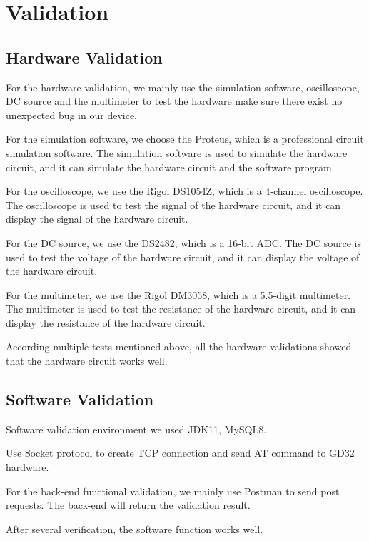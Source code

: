 \documentclass[11pt, a4paper]{article}
\begin{document}
\section{Validation}

\subsection{Hardware Validation}

For the hardware validation, we mainly use the simulation software, oscilloscope, DC source and the multimeter to test the hardware make sure there exist no unexpected bug in our device.

For the simulation software, we choose the Proteus, which is a professional circuit simulation software.
The simulation software is used to simulate the hardware circuit, and it can simulate the hardware circuit and the software program.

For the oscilloscope, we use the Rigol DS1054Z, which is a 4-channel oscilloscope.
The oscilloscope is used to test the signal of the hardware circuit, and it can display the signal of the hardware circuit.

For the DC source, we use the DS2482, which is a 16-bit ADC.
The DC source is used to test the voltage of the hardware circuit, and it can display the voltage of the hardware circuit.

For the multimeter, we use the Rigol DM3058, which is a 5.5-digit multimeter.
The multimeter is used to test the resistance of the hardware circuit, and it can display the resistance of the hardware circuit.

According multiple tests mentioned above, all the hardware validations showed that the hardware circuit works well.
\subsection{Software Validation}
Software validation environment we used JDK11, MySQL8.

Use Socket protocol to create TCP connection and send AT command to GD32 hardware.

For the back-end functional validation, we mainly use Postman to send post requests. The back-end will return the validation result.

After several verification, the software function works well.
\end{document}
